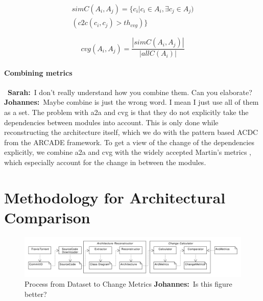 \documentclass[sigplan, anonymous, review]{acmart}
\newcommand{\sn}[1]{{\color{blue}\textbf{Sarah:}~#1}}
\newcommand{\jk}[1]{{\color{violet}\textbf{Johannes:}~#1}}
\begin{document}
\begin{equation} \label{eq:simC}
\begin{split}
simC(A_i, A_j) = \{c_i | c_i \in A_i, \exists c_j \in A_j) \\ 
(c2c(c_i, c_j) > th_{cvg})\}
\end{split}
\end{equation}

\begin{equation} \label{eq:cvg}
cvg(A_i, A_j) = \frac{|simC(A_i, A_j)|}{|allC(A_i)|}
\end{equation}

\paragraph{Combining metrics} 
~\sn{I don't really understand how you combine them. Can you elaborate?} \jk{Maybe combine is just the wrong word. I mean I just use all of them as a set. }
The problem with a2a and cvg is that they do not explicitly take the dependencies between modules into account. This is only done while reconstructing the architecture itself, which we do with the pattern based ACDC from the ARCADE framework. 
To get a view of the change of the dependencies explicitly, we combine a2a and cvg with the widely accepted Martin's metrics \cite{Val-MartinsMet}, which especially account for the change in between the modules. 

\section{Methodology for Architectural Comparison}

\begin{figure}[!t]
	\centering
	\includegraphics[width=7in]{assets/combined.pdf}
	\caption{Process from Dataset to Change Metrics \jk{Is this figure better?}}
	\label{architecture}
\end{figure}


\end{document}
